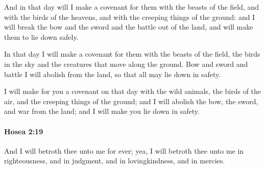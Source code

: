 			\begin{versebox}
					\item[BHS] 
					\item[LXX] 
					\item[ASV] And in that day will I make a covenant for them with the beasts of the field, and with the birds of the heavens, and with the creeping things of the ground: and I will break the bow and the sword and the battle out of the land, and will make them to lie down safely.
					\item[NIV] In that day I will make a covenant for them with the beasts of the field, the birds in the sky and the creatures that move along the ground. Bow and sword and battle I will abolish from the land, so that all may lie down in safety.
					\item[NRSV] I will make for you a covenant on that day with the wild animals, the birds of the air, and the creeping things of the ground; and I will abolish the bow, the sword, and war from the land; and I will make you lie down in safety.
			\end{versebox}

		\paragraph{Hosea 2:19} %
			\label{HOSEA-2-19}

			And I will betroth thee unto me for ever; yea, I will betroth thee unto me in righteousness, and in judgment, and in lovingkindness, and in mercies.

